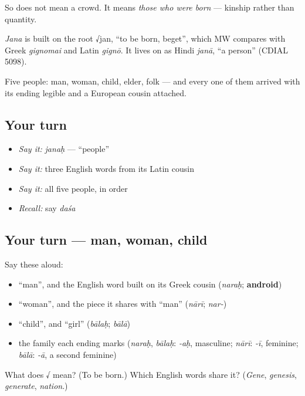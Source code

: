 So  does not mean a crowd. It means \emph{those who were born} — kinship rather than quantity.

\begin{cousinweb}
\emph{Jana} is built on the root √jan, \textquotedblleft{}to be born, beget\textquotedblright{}, which MW compares with Greek \emph{gignomai} and Latin \emph{gignō}. It lives on as Hindi \emph{janā}, \textquotedblleft{}a person\textquotedblright{} (CDIAL 5098).
\end{cousinweb}

\begin{grammarlens}[title={What you've built}]
Five people: man, woman, child, elder, folk — and every one of them arrived with its ending legible and a European cousin attached.
\end{grammarlens}

\subsection*{Your turn}
\begin{itemize}
\raggedright
  \item \emph{Say it:} \emph{janaḥ} — \textquotedblleft{}people\textquotedblright{}
  \item \emph{Say it:} three English words from its Latin cousin
  \item \emph{Say it:} all five people, in order
  \item \emph{Recall:} say \emph{daśa}
\end{itemize}

\subsection*{Your turn — man, woman, child}
Say these aloud:

\begin{itemize}
\raggedright
  \item \textquotedblleft{}man\textquotedblright{}, and the English word built on its Greek cousin (\emph{naraḥ}; \textbf{android})
  \item \textquotedblleft{}woman\textquotedblright{}, and the piece it shares with \textquotedblleft{}man\textquotedblright{} (\emph{nārī}; \emph{nar-})
  \item \textquotedblleft{}child\textquotedblright{}, and \textquotedblleft{}girl\textquotedblright{} (\emph{bālaḥ}; \emph{bālā})
  \item the family each ending marks (\emph{naraḥ}, \emph{bālaḥ}: \emph{-aḥ}, masculine; \emph{nārī}: \emph{-ī}, feminine; \emph{bālā}: \emph{-ā}, a second feminine)
\end{itemize}

\begin{tcolorbox}[breakable,colback=teal!4,colframe=teal!35!black,title={Before you move on}]
What does √ mean? (To be born.) Which English words share it? (\emph{Gene}, \emph{genesis}, \emph{generate}, \emph{nation}.)
\end{tcolorbox}
